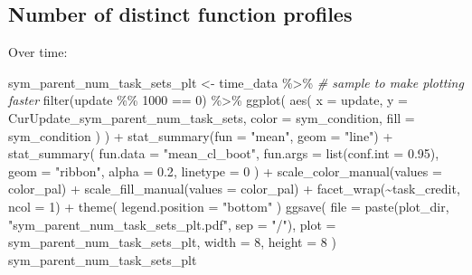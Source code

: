 \documentclass[
]{book}
\newenvironment{Shaded}{\begin{snugshade}}{\end{snugshade}}
\newcommand{\AttributeTok}[1]{\textcolor[rgb]{0.77,0.63,0.00}{#1}}
\newcommand{\CommentTok}[1]{\textcolor[rgb]{0.56,0.35,0.01}{\textit{#1}}}
\newcommand{\DecValTok}[1]{\textcolor[rgb]{0.00,0.00,0.81}{#1}}
\newcommand{\FloatTok}[1]{\textcolor[rgb]{0.00,0.00,0.81}{#1}}
\newcommand{\FunctionTok}[1]{\textcolor[rgb]{0.00,0.00,0.00}{#1}}
\newcommand{\NormalTok}[1]{#1}
\newcommand{\OtherTok}[1]{\textcolor[rgb]{0.56,0.35,0.01}{#1}}
\newcommand{\SpecialCharTok}[1]{\textcolor[rgb]{0.00,0.00,0.00}{#1}}
\newcommand{\StringTok}[1]{\textcolor[rgb]{0.31,0.60,0.02}{#1}}
\begin{document}
\hypertarget{number-of-distinct-function-profiles-11}{%
\subsection{Number of distinct function profiles}\label{number-of-distinct-function-profiles-11}}

Over time:

\begin{Shaded}
\begin{Highlighting}[]
\NormalTok{sym\_parent\_num\_task\_sets\_plt }\OtherTok{\textless{}{-}}\NormalTok{ time\_data }\SpecialCharTok{\%\textgreater{}\%}
  \CommentTok{\# sample to make plotting faster}
  \FunctionTok{filter}\NormalTok{(update }\SpecialCharTok{\%\%} \DecValTok{1000} \SpecialCharTok{==} \DecValTok{0}\NormalTok{) }\SpecialCharTok{\%\textgreater{}\%}
  \FunctionTok{ggplot}\NormalTok{(}
    \FunctionTok{aes}\NormalTok{(}
      \AttributeTok{x =}\NormalTok{ update,}
      \AttributeTok{y =}\NormalTok{ CurUpdate\_sym\_parent\_num\_task\_sets,}
      \AttributeTok{color =}\NormalTok{ sym\_condition,}
      \AttributeTok{fill =}\NormalTok{ sym\_condition}
\NormalTok{    )}
\NormalTok{  ) }\SpecialCharTok{+}
  \FunctionTok{stat\_summary}\NormalTok{(}\AttributeTok{fun =} \StringTok{"mean"}\NormalTok{, }\AttributeTok{geom =} \StringTok{"line"}\NormalTok{) }\SpecialCharTok{+}
  \FunctionTok{stat\_summary}\NormalTok{(}
    \AttributeTok{fun.data =} \StringTok{"mean\_cl\_boot"}\NormalTok{,}
    \AttributeTok{fun.args =} \FunctionTok{list}\NormalTok{(}\AttributeTok{conf.int =} \FloatTok{0.95}\NormalTok{),}
    \AttributeTok{geom =} \StringTok{"ribbon"}\NormalTok{,}
    \AttributeTok{alpha =} \FloatTok{0.2}\NormalTok{,}
    \AttributeTok{linetype =} \DecValTok{0}
\NormalTok{  ) }\SpecialCharTok{+}
  \FunctionTok{scale\_color\_manual}\NormalTok{(}\AttributeTok{values =}\NormalTok{ color\_pal) }\SpecialCharTok{+}
  \FunctionTok{scale\_fill\_manual}\NormalTok{(}\AttributeTok{values =}\NormalTok{ color\_pal) }\SpecialCharTok{+}
  \FunctionTok{facet\_wrap}\NormalTok{(}\SpecialCharTok{\textasciitilde{}}\NormalTok{task\_credit, }\AttributeTok{ncol =} \DecValTok{1}\NormalTok{) }\SpecialCharTok{+}
  \FunctionTok{theme}\NormalTok{(}
    \AttributeTok{legend.position =} \StringTok{"bottom"}
\NormalTok{  )}
\FunctionTok{ggsave}\NormalTok{(}
  \AttributeTok{file =} \FunctionTok{paste}\NormalTok{(plot\_dir, }\StringTok{"sym\_parent\_num\_task\_sets\_plt.pdf"}\NormalTok{, }\AttributeTok{sep =} \StringTok{"/"}\NormalTok{),}
  \AttributeTok{plot =}\NormalTok{ sym\_parent\_num\_task\_sets\_plt,}
  \AttributeTok{width =} \DecValTok{8}\NormalTok{,}
  \AttributeTok{height =} \DecValTok{8}
\NormalTok{)}
\NormalTok{sym\_parent\_num\_task\_sets\_plt}
\end{Highlighting}
\end{Shaded}
\end{document}
